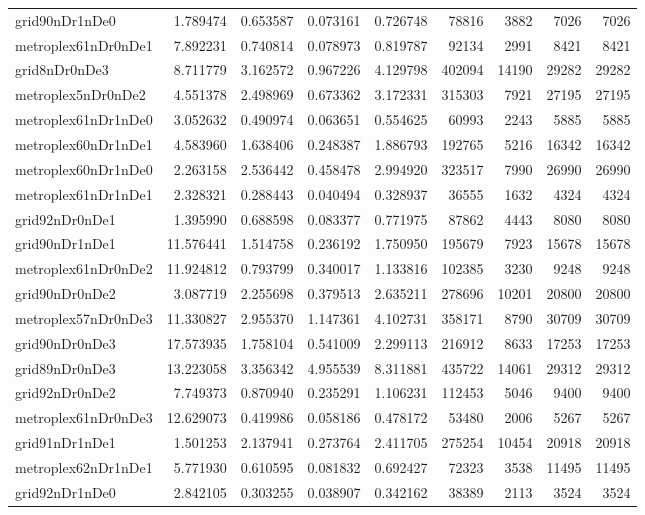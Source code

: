 \begin{longtable}{|l|r|r|r|r|r|r|r|r|}
grid90nDr1nDe0 & 1.789474 & 0.653587 & 0.073161 & 0.726748 & 78816 & 3882 & 7026 & 7026 \\
metroplex61nDr0nDe1 & 7.892231 & 0.740814 & 0.078973 & 0.819787 & 92134 & 2991 & 8421 & 8421 \\
grid8nDr0nDe3 & 8.711779 & 3.162572 & 0.967226 & 4.129798 & 402094 & 14190 & 29282 & 29282 \\
metroplex5nDr0nDe2 & 4.551378 & 2.498969 & 0.673362 & 3.172331 & 315303 & 7921 & 27195 & 27195 \\
metroplex61nDr1nDe0 & 3.052632 & 0.490974 & 0.063651 & 0.554625 & 60993 & 2243 & 5885 & 5885 \\
metroplex60nDr1nDe1 & 4.583960 & 1.638406 & 0.248387 & 1.886793 & 192765 & 5216 & 16342 & 16342 \\
metroplex60nDr1nDe0 & 2.263158 & 2.536442 & 0.458478 & 2.994920 & 323517 & 7990 & 26990 & 26990 \\
metroplex61nDr1nDe1 & 2.328321 & 0.288443 & 0.040494 & 0.328937 & 36555 & 1632 & 4324 & 4324 \\
grid92nDr0nDe1 & 1.395990 & 0.688598 & 0.083377 & 0.771975 & 87862 & 4443 & 8080 & 8080 \\
grid90nDr1nDe1 & 11.576441 & 1.514758 & 0.236192 & 1.750950 & 195679 & 7923 & 15678 & 15678 \\
metroplex61nDr0nDe2 & 11.924812 & 0.793799 & 0.340017 & 1.133816 & 102385 & 3230 & 9248 & 9248 \\
grid90nDr0nDe2 & 3.087719 & 2.255698 & 0.379513 & 2.635211 & 278696 & 10201 & 20800 & 20800 \\
metroplex57nDr0nDe3 & 11.330827 & 2.955370 & 1.147361 & 4.102731 & 358171 & 8790 & 30709 & 30709 \\
grid90nDr0nDe3 & 17.573935 & 1.758104 & 0.541009 & 2.299113 & 216912 & 8633 & 17253 & 17253 \\
grid89nDr0nDe3 & 13.223058 & 3.356342 & 4.955539 & 8.311881 & 435722 & 14061 & 29312 & 29312 \\
grid92nDr0nDe2 & 7.749373 & 0.870940 & 0.235291 & 1.106231 & 112453 & 5046 & 9400 & 9400 \\
metroplex61nDr0nDe3 & 12.629073 & 0.419986 & 0.058186 & 0.478172 & 53480 & 2006 & 5267 & 5267 \\
grid91nDr1nDe1 & 1.501253 & 2.137941 & 0.273764 & 2.411705 & 275254 & 10454 & 20918 & 20918 \\
metroplex62nDr1nDe1 & 5.771930 & 0.610595 & 0.081832 & 0.692427 & 72323 & 3538 & 11495 & 11495 \\
grid92nDr1nDe0 & 2.842105 & 0.303255 & 0.038907 & 0.342162 & 38389 & 2113 & 3524 & 3524 \\

\end{longtable}
